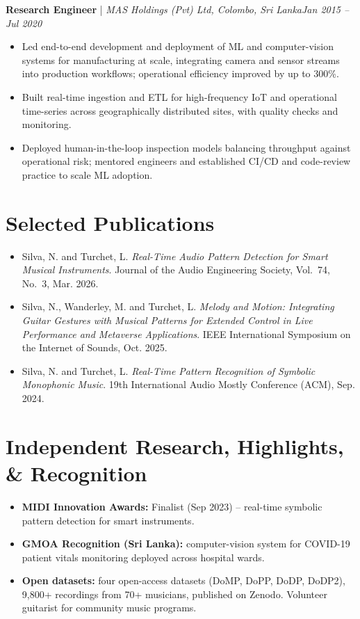 \documentclass[11pt]{article}
\newenvironment{cvrole}[5]{%
  \par\noindent\textbf{\large #1} | \textit{\small #2, #3}\hfill \textit{\small #4 -- #5}\par
  \begin{itemize}[leftmargin=2em, itemsep=-0.3em, topsep=-0.5em]%
}{%
  \end{itemize}\par\noindent\mbox{}\par\vspace{0.1em}%
}
\begin{document}
\begin{cvrole}{Research Engineer}{MAS Holdings (Pvt) Ltd}{Colombo, Sri Lanka}{Jan 2015}{Jul 2020}
    \item Led end-to-end development and deployment of ML and computer-vision systems for manufacturing at scale, integrating camera and sensor streams into production workflows; operational efficiency improved by up to 300\%.
    \item Built real-time ingestion and ETL for high-frequency IoT and operational time-series across geographically distributed sites, with quality checks and monitoring.
    \item Deployed human-in-the-loop inspection models balancing throughput against operational risk; mentored engineers and established CI/CD and code-review practice to scale ML adoption.
\end{cvrole}

\section*{Selected Publications \footnotesize {}}
\begin{itemize}[leftmargin=1.2em, itemsep=-0.25em]
    \item Silva, N. and Turchet, L. \textit{Real-Time Audio Pattern Detection for Smart Musical Instruments}. Journal of the Audio Engineering Society, Vol.~74, No.~3, Mar. 2026.
    \item Silva, N., Wanderley, M. and Turchet, L. \textit{Melody and Motion: Integrating Guitar Gestures with Musical Patterns for Extended Control in Live Performance and Metaverse Applications}. IEEE International Symposium on the Internet of Sounds, Oct. 2025.
    \item Silva, N. and Turchet, L. \textit{Real-Time Pattern Recognition of Symbolic Monophonic Music}. 19th International Audio Mostly Conference (ACM), Sep. 2024.
\end{itemize}

\vspace{-1em}
\section*{Independent Research, Highlights, \& Recognition}
\begin{itemize}[leftmargin=1.2em, itemsep=-0.25em]
    \item \textbf{MIDI Innovation Awards:} Finalist (Sep 2023) -- real-time symbolic pattern detection for smart instruments.
    \item \textbf{GMOA Recognition (Sri Lanka):} computer-vision system for COVID-19 patient vitals monitoring deployed across hospital wards.
    \item \textbf{Open datasets:} four open-access datasets (DoMP, DoPP, DoDP, DoDP2), 9,800+ recordings from 70+ musicians, published on Zenodo. Volunteer guitarist for community music programs.
\end{itemize}
\end{document}
